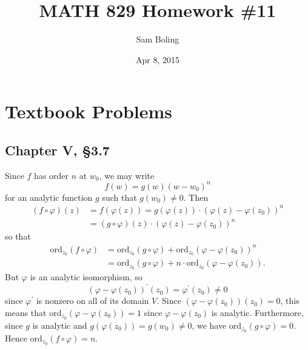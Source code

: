 \documentclass{article}
\title{MATH 829 Homework \#11}
\date{Apr 8, 2015}
\author{Sam Boling}
\newcommand\ord{\mathrm{ord}}
\newcounter{Problem}
\begin{document}
\begin{titlepage}
\maketitle
\end{titlepage}

\section{Textbook Problems}

\subsection*{Chapter V, \S 3.7}
Since $f$ has order $n$ at $w_0$, we may write
$$
f(w) = g(w) (w - w_0)^n
$$
for an analytic function $g$ such that $g(w_0) \neq 0$.
Then
\begin{align*}
  (f \circ \varphi)(z)
&= f(\varphi(z))
 = g (\varphi(z)) \cdot (\varphi(z) - \varphi(z_0))^n \\
&= (g \circ \varphi) (z) \cdot (\varphi(z) - \varphi(z_0))^n
\end{align*}
so that
\begin{align*}
   \ord_{z_0} (f \circ \varphi)
&= \ord_{z_0} (g \circ \varphi)
 + \ord_{z_0} (\varphi - \varphi(z_0))^n \\
&= \ord_{z_0} (g \circ \varphi)
 + n \cdot \ord_{z_0} (\varphi - \varphi(z_0)).
\end{align*}
But $\varphi$ is an analytic isomorphism, so
$$
  (\varphi - \varphi(z_0))^\prime(z_0)
= \varphi^\prime(z_0)
\neq 0
$$
since $\varphi^\prime$ is nonzero on all of its domain $V$.
Since $(\varphi - \varphi(z_0))(z_0) = 0$, this means that
$\ord_{z_0} (\varphi - \varphi(z_0)) = 1$ since
$\varphi - \varphi(z_0)$ is analytic. Furthermore,
since $g$ is analytic and
$g(\varphi(z_0)) = g(w_0) \neq 0$, we have
$\ord_{z_0} (g \circ \varphi) = 0$. Hence
$\ord_{z_0} (f \circ \varphi) = n$.
\end{document}
